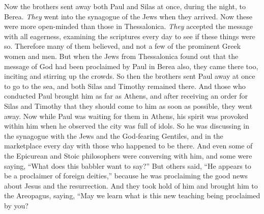 \begin{biblechapter}
 Now the brothers sent away both Paul and Silas at once, during the night, to Berea. \textit{They} went into the synagogue of the Jews when they arrived.
\verse Now these were more open-minded than those in Thessalonica. \textit{They} accepted the message with all eagerness, examining the scriptures every day to see if these things were so.
\verse Therefore many of them believed, and not a few of the prominent Greek women and men.
\verse But when the Jews from Thessalonica found out that the message of God had been proclaimed by Paul in Berea also, they came there too, inciting and stirring up the crowds.
\verse So then the brothers sent Paul away at once to go to the sea, and both Silas and Timothy remained there.
\verse And those who conducted Paul brought him as far as Athens, and after receiving an order for Silas and Timothy that they should come to him as soon as possible, they went away.
 Now while Paul was waiting for them in Athens, his spirit was provoked within him when he observed the city was full of idols.
\verse So he was discussing in the synagogue with the Jews and the God-fearing Gentiles, and in the marketplace every day with those who happened to be there.
\verse And even some of the Epicurean and Stoic philosophers were conversing with him, and some were saying, “What does this babbler want to say?” But others said, “He appears to be a proclaimer of foreign deities,” because he was proclaiming the good news about Jesus and the resurrection.
\verse And they took hold of him and brought him to the Areopagus, saying, “May we learn what is this new teaching being proclaimed by you?

\end{biblechapter}
